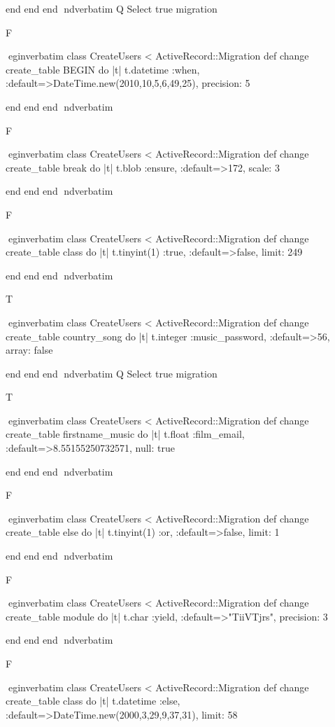     end 
  end 
end
nd{verbatim}
Q
 Select true migration

F

egin{verbatim}
 class CreateUsers < ActiveRecord::Migration 
  def change 
    create_table BEGIN do |t| 
      t.datetime :when, :default=>DateTime.new(2010,10,5,6,49,25), precision: 5
    
    end 
  end 
end
nd{verbatim}

F

egin{verbatim}
 class CreateUsers < ActiveRecord::Migration 
  def change 
    create_table break do |t| 
      t.blob :ensure, :default=>172, scale: 3
    
    end 
  end 
end
nd{verbatim}

F

egin{verbatim}
 class CreateUsers < ActiveRecord::Migration 
  def change 
    create_table class do |t| 
      t.tinyint(1) :true, :default=>false, limit: 249
    
    end 
  end 
end
nd{verbatim}

T

egin{verbatim}
 class CreateUsers < ActiveRecord::Migration 
  def change 
    create_table country_song do |t| 
      t.integer :music_password, :default=>56, array: false
    
    end 
  end 
end
nd{verbatim}
Q
 Select true migration

T

egin{verbatim}
 class CreateUsers < ActiveRecord::Migration 
  def change 
    create_table firstname_music do |t| 
      t.float :film_email, :default=>8.55155250732571, null: true
    
    end 
  end 
end
nd{verbatim}

F

egin{verbatim}
 class CreateUsers < ActiveRecord::Migration 
  def change 
    create_table else do |t| 
      t.tinyint(1) :or, :default=>false, limit: 1
    
    end 
  end 
end
nd{verbatim}

F

egin{verbatim}
 class CreateUsers < ActiveRecord::Migration 
  def change 
    create_table module do |t| 
      t.char :yield, :default=>"TiiVTjrs", precision: 3
    
    end 
  end 
end
nd{verbatim}

F

egin{verbatim}
 class CreateUsers < ActiveRecord::Migration 
  def change 
    create_table class do |t| 
      t.datetime :else, :default=>DateTime.new(2000,3,29,9,37,31), limit: 58
    

